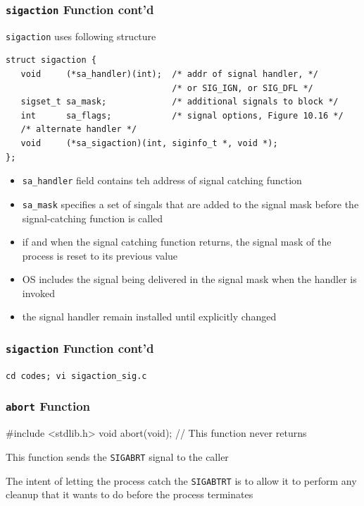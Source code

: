 \documentclass[newPxFont,sthlmFooter,nooffset]{beamer}
\begin{document}
\begin{frame}
  \frametitle{\texttt{sigaction} Function cont'd}
\texttt{sigaction} uses following structure
{\footnotesize
\begin{verbatim}
struct sigaction {
   void     (*sa_handler)(int);  /* addr of signal handler, */
                                 /* or SIG_IGN, or SIG_DFL */
   sigset_t sa_mask;             /* additional signals to block */
   int      sa_flags;            /* signal options, Figure 10.16 */
   /* alternate handler */
   void     (*sa_sigaction)(int, siginfo_t *, void *);
};
\end{verbatim}
}
{\footnotesize
\begin{itemize}
\item \texttt{sa\_handler} field contains teh address of signal catching function
\item \texttt{sa\_mask} specifies a set of singals that are added to the signal mask before the signal-catching function is called
\item if and when the signal catching function returns, the signal mask of the process is reset to its previous value
\item OS includes the signal being delivered in the signal mask when the handler is invoked
\item the signal handler remain installed until explicitly changed
\end{itemize}
}
\end{frame}


\begin{frame}[fragile,t]
  \frametitle{\texttt{sigaction} Function cont'd}
\texttt{cd codes; vi sigaction\_sig.c}


\end{frame}

\begin{frame}[containsverbatim,t]
  \frametitle{\texttt{abort} Function}
\begin{codedef}
#include <stdlib.h>
void abort(void);
// This function never returns  
\end{codedef}

This function sends the \texttt{SIGABRT} signal to the caller

The intent of letting the process catch the \texttt{SIGABTRT} is to allow it to perform any cleanup that it wants to do before the process terminates

\end{frame}
\end{document}
